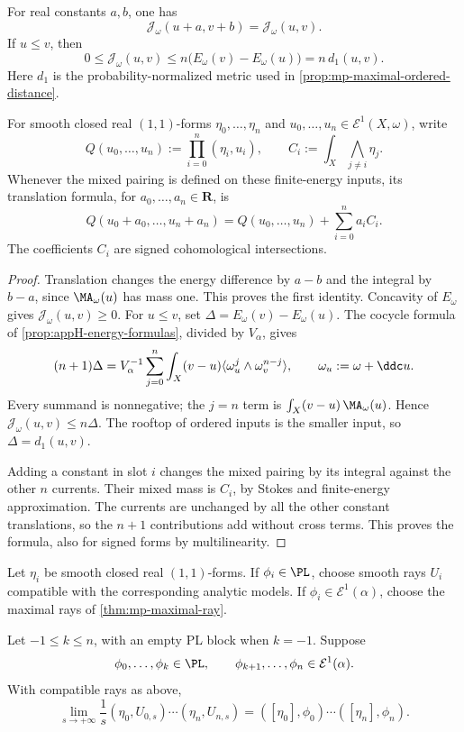 \begin{lemma}\label{lem:mp-mixed-centering}
For real constants $a,b$, one has
\[
 \mathcal J_\omega(u+a,v+b)=\mathcal J_\omega(u,v).
\]
If $u\leq v$, then
\[
 0\leq\mathcal J_\omega(u,v)
 \leq n\bigl(E_\omega(v)-E_\omega(u)\bigr)
 =n\,d_1(u,v).
\]
Here $d_1$ is the probability-normalized metric used in \cref{prop:mp-maximal-ordered-distance}.

For smooth closed real $(1,1)$-forms $\eta_0,\ldots,\eta_n$ and $u_0,\ldots,u_n\in\mathcal E^1(X,\omega)$, write
\[
 Q(u_0,\ldots,u_n):=\prod_{i=0}^n(\eta_i,u_i),\qquad
 C_i:=\int_X\bigwedge_{j\ne i}\eta_j.
\]
Whenever the mixed pairing is defined on these finite-energy inputs, its translation formula, for $a_0,\ldots,a_n\in\mathbf R$, is
\[
 Q(u_0+a_0,\ldots,u_n+a_n)
       =Q(u_0,\ldots,u_n)+\sum_{i=0}^n a_iC_i.
\]
The coefficients $C_i$ are signed cohomological intersections.
\end{lemma}

\begin{proof}
Translation changes the energy difference by $a-b$ and the integral by $b-a$, since $\MA_\omega(u)$ has mass one. This proves the first identity. Concavity of $E_\omega$ gives $\mathcal J_\omega(u,v)\geq0$. For $u\leq v$, set $\Delta=E_\omega(v)-E_\omega(u)$. The cocycle formula of \cref{prop:appH-energy-formulas}, divided by $V_\alpha$, gives
\[
 (n+1)\Delta
   =V_\alpha^{-1}\sum_{j=0}^n
       \int_X(v-u)\langle\omega_u^j\wedge\omega_v^{n-j}\rangle,
 \qquad \omega_u:=\omega+\ddc u.
\]
Every summand is nonnegative; the $j=n$ term is $\int_X(v-u)\,\MA_\omega(u)$. Hence $\mathcal J_\omega(u,v)\leq n\Delta$. The rooftop of ordered inputs is the smaller input, so $\Delta=d_1(u,v)$.

Adding a constant in slot $i$ changes the mixed pairing by its integral against the other $n$ currents. Their mixed mass is $C_i$, by Stokes and finite-energy approximation. The currents are unchanged by all the other constant translations, so the $n+1$ contributions add without cross terms. This proves the formula, also for signed forms by multilinearity.
\end{proof}

Let $\eta_i$ be smooth closed real $(1,1)$-forms. If $\phi_i\in\PL$, choose smooth rays $U_i$ compatible with the corresponding analytic models. If $\phi_i\in\mathcal E^1(\alpha)$, choose the maximal rays of \cref{thm:mp-maximal-ray}.

\begin{theorem}\label{thm:mp-mixed-slope}
Let $-1\leq k\leq n$, with an empty PL block when $k=-1$. Suppose
\[
 \phi_0,\ldots,\phi_k\in\PL,
 \qquad
 \phi_{k+1},\ldots,\phi_n\in\mathcal E^1(\alpha).
\]
With compatible rays as above,
\[
 \lim_{s\to+\infty}\frac1s
   (\eta_0,U_{0,s})\cdots(\eta_n,U_{n,s})
   =([\eta_0],\phi_0)\cdots([\eta_n],\phi_n).
\tag{60.24}\label{eq:mp-mixed-slope}
\]
\end{theorem}

